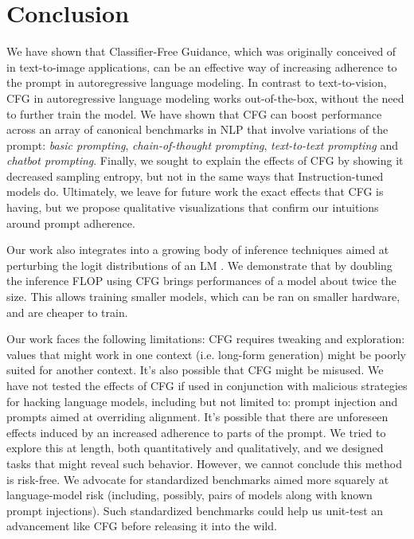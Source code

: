 \documentclass{article}
\begin{document}
\section{Conclusion}

We have shown that Classifier-Free Guidance, which was originally conceived of in text-to-image applications, can be an effective way of increasing adherence to the prompt in autoregressive language modeling. In contrast to text-to-vision, CFG in autoregressive language modeling works out-of-the-box, without the need to further train the model. We have shown that CFG can boost performance across an array of canonical benchmarks in NLP that involve variations of the prompt: \textit{basic prompting}, \textit{chain-of-thought prompting}, \textit{text-to-text prompting} and \textit{chatbot prompting}. Finally, we sought to explain the effects of CFG by showing it decreased sampling entropy, but not in the same ways that Instruction-tuned models do. Ultimately, we leave for future work the exact effects that CFG is having, but we propose qualitative visualizations that confirm our intuitions around prompt adherence.

Our work also integrates into a growing body of inference techniques aimed at perturbing the logit distributions of an LM \cite{li2022contrastive, shi2023trusting}. We demonstrate that by doubling the inference FLOP using CFG brings performances of a model about twice the size. This allows training smaller models, which can be ran on smaller hardware, and are cheaper to train.

Our work faces the following limitations: CFG requires tweaking and exploration:  values that might work in one context (i.e. long-form generation) might be poorly suited for another context. It's also possible that CFG might be misused. We have not tested the effects of CFG if used in conjunction with malicious strategies for hacking language models, including but not limited to: prompt injection and prompts aimed at overriding alignment. It's possible that there are unforeseen effects induced by an increased adherence to parts of the prompt. We tried to explore this at length, both quantitatively and qualitatively, and we designed tasks that might reveal such behavior. However, we cannot conclude this method is risk-free. We advocate for standardized benchmarks aimed more squarely at language-model risk (including, possibly, pairs of models along with known prompt injections). Such standardized benchmarks could help us unit-test an advancement like CFG before releasing it into the wild. 
\end{document}
